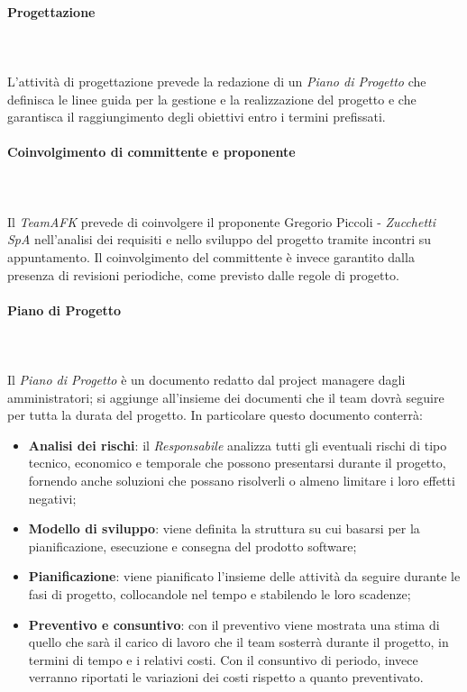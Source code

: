 			\paragraph{Progettazione} \mbox{} \\ \mbox{} \\
			L'attività di progettazione prevede la redazione di un \textit{Piano di Progetto} che definisca le linee guida per la gestione e la realizzazione del progetto e che garantisca il raggiungimento degli obiettivi entro i termini prefissati.	
			
			\paragraph*{Coinvolgimento di committente e proponente}	\mbox{} \\ \mbox{} \\
			Il \textit{TeamAFK} prevede di coinvolgere il proponente Gregorio Piccoli - \textit{Zucchetti SpA} nell'analisi dei requisiti e nello sviluppo del progetto tramite incontri su appuntamento. Il coinvolgimento del committente è invece garantito dalla presenza di revisioni periodiche, come previsto dalle regole di progetto.		
			
			\paragraph*{Piano di Progetto} \mbox{} \\ \mbox{} \\
			Il \textit{Piano di Progetto} è un documento redatto dal project manager\glo e dagli amministratori; si aggiunge all'insieme dei documenti che il team dovrà seguire per tutta la durata del progetto. In particolare questo documento conterrà:
			\begin{itemize}
				\item \textbf{Analisi dei rischi}: il \textit{Responsabile} analizza tutti gli eventuali rischi di tipo tecnico, economico e temporale che possono presentarsi durante il progetto, fornendo anche soluzioni che possano risolverli o almeno limitare i loro effetti negativi;
				\item \textbf{Modello di sviluppo}: viene definita la struttura su cui basarsi per la pianificazione, esecuzione e consegna del prodotto software;
				\item \textbf{Pianificazione}: viene pianificato l'insieme delle attività da seguire durante le fasi di progetto, collocandole nel tempo e stabilendo le loro scadenze;
				\item \textbf{Preventivo e consuntivo}: con il preventivo viene mostrata una stima di quello che sarà il carico di lavoro che il team sosterrà durante il progetto, in termini di tempo e i relativi costi. Con il consuntivo di periodo, invece verranno riportati le variazioni dei costi rispetto a quanto preventivato.
			\end{itemize}
